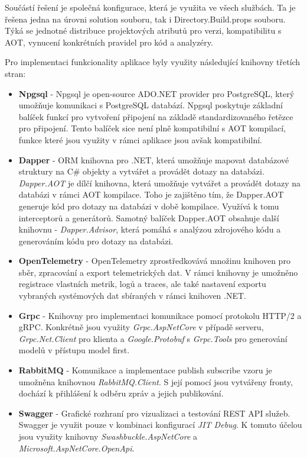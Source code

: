 Součástí řešení je společná konfigurace, která je využita ve všech službách. Ta je řešena jedna na úrovni solution souboru, tak i Directory.Build.props souboru. Týká se jednotné distribuce projektových atributů pro verzi, kompatibilitu s AOT, vynucení konkrétních pravidel pro kód a analyzéry.


Pro implementaci funkcionality aplikace byly využity následující knihovny třetích stran:

\begin{itemize}
  \item \textbf{Npgsql} - Npgsql je open-source ADO.NET provider pro PostgreSQL, který umožňuje komunikaci s PostgreSQL databází. Npgsql poskytuje základní balíček funkcí pro vytvoření připojení na základě standardizovaného řetězce pro připojení. Tento balíček sice není plně kompatibilní s AOT kompilací, funkce které jsou využity v rámci aplikace jsou avšak kompatibilní.
  \item \textbf{Dapper} - ORM knihovna pro .NET, která umožňuje mapovat databázové struktury na C\# objekty a vytvářet a provádět dotazy na databázi. \emph{Dapper.AOT} je dílčí knihovna, která umožňuje vytvářet a provádět dotazy na databázi v rámci AOT kompilace. Toho je zajištěno tím, že Dapper.AOT generuje kód pro dotazy na databázi v době kompilace. Využívá k tomu interceptorů a generátorů. Samotný balíček Dapper.AOT obsahuje další knihovnu - \emph{Dapper.Advisor}, která pomáhá s analýzou zdrojového kódu a generováním kódu pro dotazy na databázi.
  \item \textbf{OpenTelemetry} - OpenTelemetry zprostředkovává množinu knihoven pro sběr, zpracování a export telemetrických dat. V rámci knihovny je umožněno registrace vlastních metrik, logů a traces, ale také nastavení exportu vybraných systémových dat sbíraných v rámci knihoven .NET.
  \item \textbf{Grpc} - Knihovny pro implementaci komunikace pomocí protokolu HTTP/2 a gRPC. Konkrétně jsou využity \emph{Grpc.AspNetCore} v případě serveru, \\ \emph{Grpc.Net.Client} pro klienta a \emph{Google.Protobuf} s \emph{Grpc.Tools} pro generování modelů v přístupu model first.
  \item \textbf{RabbitMQ} - Komunikace a implementace publish subscribe vzoru je umožněna knihovnou \emph{RabbitMQ.Client}. S její pomocí jsou vytvářeny fronty, dochází k přihlášení k odběru zpráv a jejich publikování.
  \item \textbf{Swagger} - Grafické rozhraní pro vizualizaci a testování REST API služeb. Swagger je využit pouze v kombinaci konfigurací \emph{JIT Debug}. K tomuto účelou jsou využity knihovny \emph{Swashbuckle.AspNetCore} a \emph{Microsoft.AspNetCore.OpenApi}.
\end{itemize}

